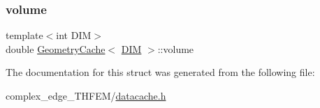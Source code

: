 \mbox{\label{struct_geometry_cache_ad6c7cd9d170b7fbcc819312dde144e37}} 
\subsubsection{\texorpdfstring{volume}{volume}}
{\footnotesize\ttfamily template$<$int D\+IM$>$ \\
double \mbox{\hyperlink{struct_geometry_cache}{Geometry\+Cache}}$<$ \mbox{\hyperlink{complex__node___t_h_f_e_m_2uiexp_8h_a589b8b9bfdf714f736059845d568b597}{D\+IM}} $>$\+::volume}



The documentation for this struct was generated from the following file\+:\begin{DoxyCompactItemize}
\item 
complex\+\_\+edge\+\_\+\+T\+H\+F\+E\+M/\mbox{\hyperlink{complex__edge___t_h_f_e_m_2datacache_8h}{datacache.\+h}}\end{DoxyCompactItemize}
